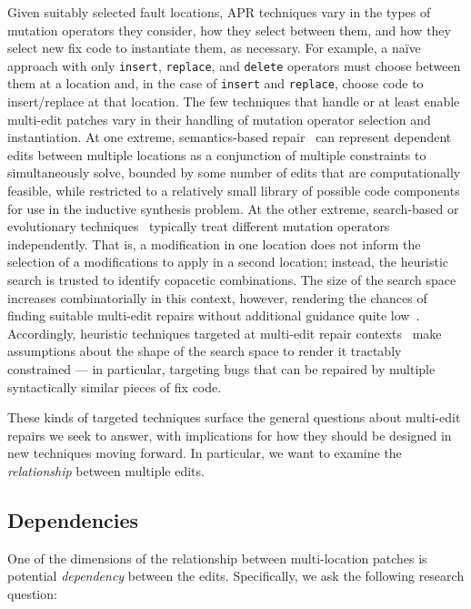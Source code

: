 \documentclass[sigconf, timestamp-false, anonymous=true]{acmart}
\begin{document}
Given suitably selected fault locations, APR techniques vary in the types of
mutation operators they consider, how they select between them, and how they
select new fix code to instantiate them, as necessary.  For example, a na{\"i}ve
approach with only \texttt{insert}, \texttt{replace}, and \texttt{delete}
operators must choose between them at a location and, in the case of
\texttt{insert} and \texttt{replace}, choose code to insert/replace at that
location.  
%
The few techniques that handle or at least enable multi-edit patches vary in their
handling of mutation operator selection and instantiation.  At one
extreme, semantics-based repair~\cite{s3,angelix} can represent dependent edits between multiple
locations as a conjunction of multiple constraints to simultaneously solve,
bounded by some number of edits that are computationally feasible, while
restricted to a relatively small library of possible code components for use in
the inductive synthesis problem.    At the other extreme, search-based or
evolutionary techniques~\cite{genprog,par} typically treat different mutation
operators independently.  That is, a modification in one location does not
inform the selection of a modifications to apply in a second location; instead,
the heuristic search is trusted to identify copacetic combinations.  The size of
the search space increases combinatorially in this context, however, rendering
the chances of finding suitable multi-edit repairs without additional guidance
quite low~\cite{ae,long2016}. Accordingly, heuristic techniques targeted at multi-edit
repair contexts~\cite{hercules,maybewang2018} make assumptions about the
shape of the search space to render it tractably constrained --- in particular,
targeting bugs that can be repaired by multiple syntactically similar pieces of
fix code.

These kinds of targeted techniques surface the general questions about
multi-edit repairs we seek to answer, with
implications for how they should be designed in new techniques moving forward.
In particular, we want to examine the \emph{relationship} between multiple edits.

\subsection{Dependencies}

One of the dimensions of the relationship between multi-location patches is potential
\emph{dependency} between the edits. Specifically, we ask the following research question:
\end{document}
